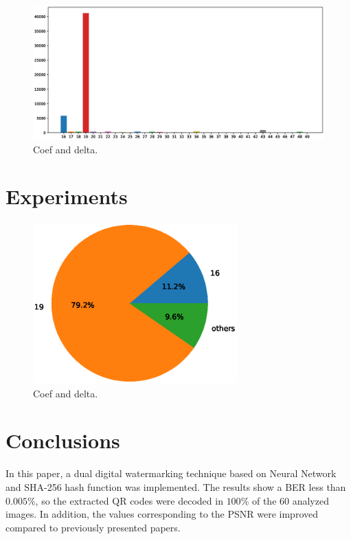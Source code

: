\documentclass[runningheads]{llncs}
\begin{document}
\begin{figure} [H]
	\begin{center}
		\includegraphics[width=\textwidth]{frequency_bar.eps}
		\caption{Coef and delta.} \label{frequency_bar}
	\end{center}
\end{figure}

\section{Experiments}

\begin{figure} [H]
	\begin{center}
		\includegraphics[width=0.7\textwidth]{pastel.eps}
		\caption{Coef and delta.} \label{pastel}
	\end{center}
\end{figure}

\section{Conclusions}
In this paper, a dual digital watermarking technique based on Neural Network and SHA-256 hash function was implemented. The results show a BER less than $0.005 \%$, so the extracted QR codes were decoded in $100\%$ of the $60$ analyzed images. In addition, the values corresponding to the PSNR were improved compared to previously presented papers.
%
%
%


%
\end{document}
